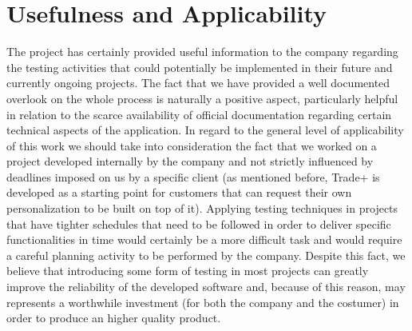 \section{Usefulness and Applicability} 

The project has certainly provided useful information to the company regarding the testing activities that could potentially be implemented in their future and currently ongoing projects. The fact that we have provided a well documented overlook on the whole process is naturally a positive aspect, particularly helpful in relation to the scarce availability of official documentation regarding certain technical aspects of the application. 
In regard to the general level of applicability of this work we should take into consideration the fact that we worked on a project developed internally by the company and not strictly influenced by deadlines imposed on us by a specific client (as mentioned before, Trade+ is developed as a starting point for customers that can request their own personalization to be built on top of it). Applying testing techniques in projects that have tighter schedules that need to be followed in order to deliver specific functionalities in time would certainly be a more difficult task and would require a careful planning activity to be performed by the company. Despite this fact, we believe that introducing some form of testing in most projects can greatly improve the reliability of the developed software and, because of this reason, may represents a worthwhile investment (for both the company and the costumer) in order to produce an higher quality product.